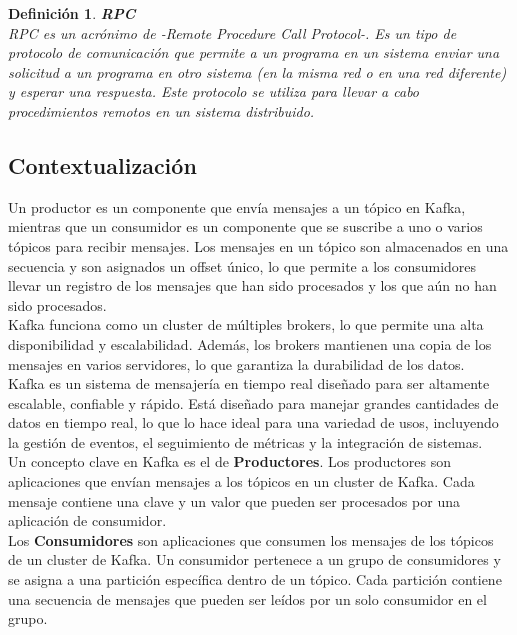 \documentclass{article}
\newtheorem{defi}[propo]{Definición}
\begin{document}
\begin{defi}\textbf{RPC}\\
RPC es un acrónimo de -Remote Procedure Call Protocol-. Es un tipo de protocolo de comunicación que permite a un programa en un sistema enviar una solicitud a un programa en otro sistema (en la misma red o en una red diferente) y esperar una respuesta. Este protocolo se utiliza para llevar a cabo procedimientos remotos en un sistema distribuido.
\end{defi}

\subsection{Contextualización}
Un productor es un componente que envía mensajes a un tópico en Kafka, mientras que un consumidor es un componente que se suscribe a uno o varios tópicos para recibir mensajes. Los mensajes en un tópico son almacenados en una secuencia y son asignados un offset único, lo que permite a los consumidores llevar un registro de los mensajes que han sido procesados y los que aún no han sido procesados.\\

Kafka funciona como un cluster de múltiples brokers, lo que permite una alta disponibilidad y escalabilidad. Además, los brokers mantienen una copia de los mensajes en varios servidores, lo que garantiza la durabilidad de los datos.\\

Kafka es un sistema de mensajería en tiempo real diseñado para ser altamente escalable, confiable y rápido. Está diseñado para manejar grandes cantidades de datos en tiempo real, lo que lo hace ideal para una variedad de usos, incluyendo la gestión de eventos, el seguimiento de métricas y la integración de sistemas.\\

Un concepto clave en Kafka es el de \textbf{Productores}. Los productores son aplicaciones que envían mensajes a los tópicos en un cluster de Kafka. Cada mensaje contiene una clave y un valor que pueden ser procesados por una aplicación de consumidor.\\

Los \textbf{Consumidores} son aplicaciones que consumen los mensajes de los tópicos de un cluster de Kafka. Un consumidor pertenece a un grupo de consumidores y se asigna a una partición específica dentro de un tópico. Cada partición contiene una secuencia de mensajes que pueden ser leídos por un solo consumidor en el grupo.\\
\end{document}
